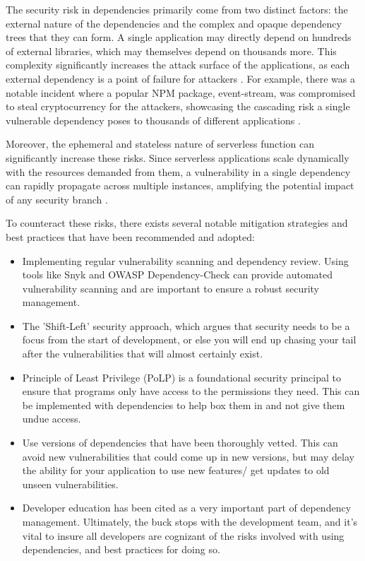 \documentclass[sigconf]{acmart}
\begin{document}
The security risk in dependencies primarily come from two distinct factors: the external nature of the dependencies and the complex and opaque dependency trees that they can form. A single application may directly depend on hundreds of external libraries, which may themselves depend on thousands more. This complexity significantly increases the attack surface of the applications, as each external dependency is a point of failure for attackers \cite{OWASP2021top}. For example, there was a notable incident where a popular NPM package, event-stream, was compromised to steal cryptocurrency for the attackers, showcasing the cascading risk a single vulnerable dependency poses to thousands of different applications \cite{fox2018open}.

Moreover, the ephemeral and stateless nature of serverless function can significantly increase these risks. Since serverless applications scale dynamically with the resources demanded from them, a vulnerability in a single dependency can rapidly propagate across multiple instances, amplifying the potential impact of any security branch \cite{kavis2014cloud}.

To counteract these risks, there exists several notable mitigation strategies and best practices that have been recommended and adopted:

\begin{itemize}
	\item Implementing regular vulnerability scanning and dependency review. Using tools like Snyk and OWASP Dependency-Check can provide automated vulnerability scanning and are important to ensure a robust security management.
	\item The 'Shift-Left' security approach, which argues that security needs to be a focus from the start of development, or else you will end up chasing your tail after the vulnerabilities that will almost certainly exist.
	\item Principle of Least Privilege (PoLP) is a foundational security principal to ensure that programs only have access to the permissions they need. This can be implemented with dependencies to help box them in and not give them undue access.
	\item Use versions of dependencies that have been thoroughly vetted. This can avoid new vulnerabilities that could come up in new versions, but may delay the ability for your application to use new features/ get updates to old unseen vulnerabilities.
	\item Developer education has been cited as a very important part of dependency management. Ultimately, the buck stops with the development team, and it's vital to insure all developers are cognizant of the risks involved with using dependencies, and best practices for doing so.

\end{itemize}
\end{document}
